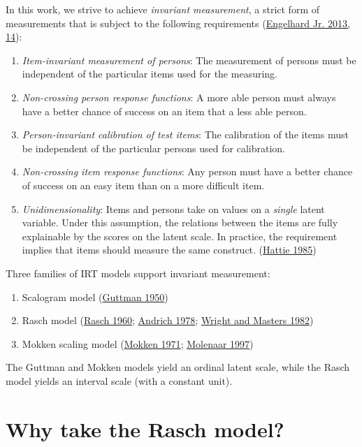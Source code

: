 \documentclass[
]{book}
\begin{document}
In this work, we strive to achieve \emph{invariant measurement}, a strict form of measurements that is subject to the following requirements (\protect\hyperlink{ref-engelhard2013}{Engelhard Jr. 2013, 14}):

\begin{enumerate}
\def\labelenumi{\arabic{enumi}.}
\item
  \emph{Item-invariant measurement of persons}: The measurement of persons must be independent of the particular items used for the measuring.
\item
  \emph{Non-crossing person response functions}: A more able person must always have a better chance of success on an item that a less able person.
\item
  \emph{Person-invariant calibration of test items}: The calibration of the items must be independent of the particular persons used for calibration.
\item
  \emph{Non-crossing item response functions}: Any person must have a better chance of success on an easy item than on a more difficult item.
\item
  \emph{Unidimensionality}: Items and persons take on values on a \emph{single} latent variable. Under this assumption, the relations between the items are fully explainable by the scores on the latent scale. In practice, the requirement implies that items should measure the same construct. (\protect\hyperlink{ref-hattie1985}{Hattie 1985})
\end{enumerate}

Three families of IRT models support invariant measurement:

\begin{enumerate}
\def\labelenumi{\arabic{enumi}.}
\item
  Scalogram model (\protect\hyperlink{ref-guttman1950}{Guttman 1950})
\item
  Rasch model (\protect\hyperlink{ref-rasch1960}{Rasch 1960}; \protect\hyperlink{ref-andrich1978}{Andrich 1978}; \protect\hyperlink{ref-wright1982}{Wright and Masters 1982})
\item
  Mokken scaling model (\protect\hyperlink{ref-mokken1971}{Mokken 1971}; \protect\hyperlink{ref-molenaar1997}{Molenaar 1997})
\end{enumerate}

The Guttman and Mokken models yield an ordinal latent scale, while the Rasch model yields an interval scale (with a constant unit).

\hypertarget{sec:whyrasch}{%
\section{Why take the Rasch model?}\label{sec:whyrasch}}
\end{document}
